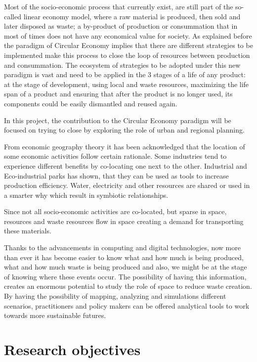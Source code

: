 Most of the socio-economic process that currently exist, are still part of the so-called linear economy model, where a raw material is produced, then sold and later disposed as waste; a by-product of production or consummation that in most of times does not have any economical value for society. As explained before the paradigm of Circular Economy implies that there are different strategies to be implemented make this process to close the loop of resources between production and consummation. The ecosystem of strategies to be adopted under this new paradigm is vast and need to be applied in the 3 stages of a life of any product: at the stage of development, using local and waste resources, maximizing the life span of a product and ensuring that after the product is no longer used, its components could be easily dismantled and reused again. \par
In this project, the contribution to the Circular Economy paradigm will be focused on trying to close by exploring the role of urban and regional planning. \par
From economic geography theory it has been acknowledged that the location of some economic activities follow certain rationale. Some industries tend to experience different benefits by co-locating one next to the other. Industrial and Eco-industrial parks has shown, that they can be used as tools to increase production efficiency. Water, electricity and other resources are shared or used in a smarter why which result in symbiotic relationships. \par
Since not all socio-economic activities are co-located, but sparse in space, resources and waste resources flow in space creating a demand for transporting these materials. \par
Thanks to the advancements in computing and digital technologies, now more than ever it has become easier to know what and how much is being produced, what and how much waste is being produced and also, we might be at the stage of knowing where these events occur. The possibility of having this information, creates an enormous potential to study the role of space to reduce waste creation. By having the possibility of mapping, analyzing and simulations different scenarios, practitioners and policy makers can be offered analytical tools to work towards more sustainable futures. \par

\section{Research objectives}

